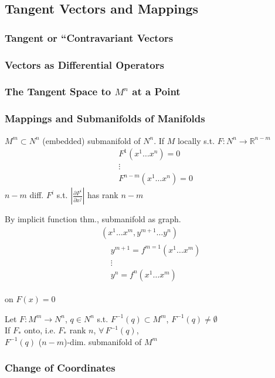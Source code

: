 \subsection{Tangent Vectors and Mappings}

\subsubsection{ Tangent or ``Contravariant Vectors}

\subsubsection{ Vectors as Differential Operators}



\subsubsection{ The Tangent Space to $M^n$ at a Point }


\subsubsection{ Mappings and Submanifolds of Manifolds}


\begin{definition} $M^m \subset N^n$ (embedded) submanifold of $N^n$.  If $M$ locally s.t. $F: N^n \to \mathbb{R}^{n-m}$ 
\[
\begin{aligned}
  & F^1(x^1 \dots x^n) = 0 \\ 
  & \vdots \\ 
  & F^{n-m}(x^1 \dots x^n) = 0 
\end{aligned}
\]
$n-m$ diff. $F^i$ s.t. $\left| \frac{ \partial F^i}{ \partial x^j} \right| $ has rank $n-m$
\end{definition}

By implicit function thm., submanifold as graph.  
\[
\begin{gathered}
  (x^1 \dots x^m, y^{m+1} \dots y^n ) \\ 
  \begin{aligned}
    & y^{m+1} = f^{m=1}(x^1 \dots x^m)  \\ 
    & \vdots \\ 
    & y^n = f^n(x^1 \dots x^m)
\end{aligned}
\end{gathered}
\]

on $F(x) = 0$ 

\begin{theorem}[1.12] Let $F: M^m \to N^n$, $q \in N^n$ s.t. $F^{-1}(q) \subset M^m $, $F^{-1}(q) \neq \emptyset$ \\
If $F_*$ onto, i.e. $F_*$ rank $n$, $\forall \, F^{-1}(q)$, \\
$F^{-1}(q)$ ($n-m$)-dim. submanifold of $M^m$
\end{theorem}




\subsubsection{ Change of Coordinates}


